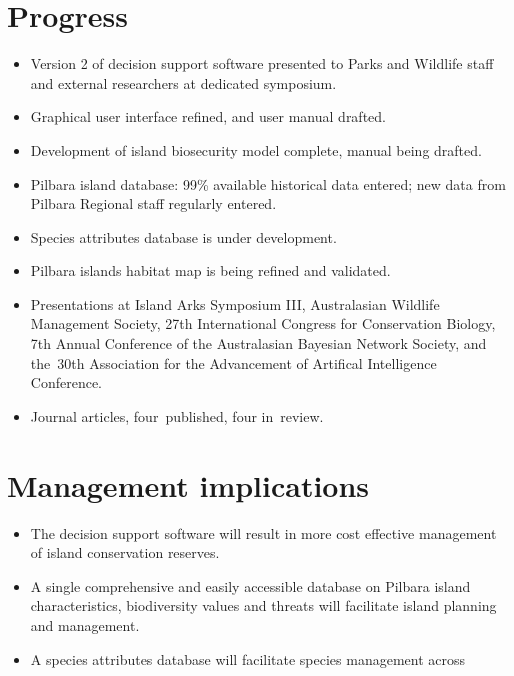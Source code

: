 \documentclass[version=last,
    paper=a4, %
    10pt, %
    usenames,
    dvipsnames,
    oneside, %
    headings=openany, %
    DIV=15 %
]{scrbook}
\begin{document}
\section*{Progress}

\begin{itemize}
\itemsep1pt\parskip0pt
\item
  Version 2 of decision support software presented to Parks and Wildlife
  staff and external researchers at dedicated symposium.~
\item
  Graphical user interface refined, and user manual drafted.
\item
  Development of island biosecurity model complete, manual being
  drafted.
\item
  Pilbara island database: 99\% available historical data entered; new
  data from Pilbara Regional staff regularly entered.
\item
  Species attributes database is under development.
\item
  Pilbara islands habitat map is being refined and validated.
\item
  Presentations at Island Arks Symposium III, Australasian Wildlife
  Management Society, 27th International Congress for Conservation
  Biology, 7th Annual Conference of the Australasian Bayesian Network
  Society, and the~30th Association for the Advancement of Artifical
  Intelligence Conference.
\item
  Journal articles, four~published, four in~review.
\end{itemize}




\section*{Management implications}

\begin{itemize}
\itemsep1pt\parskip0pt
\item
  The decision support software will result in more cost effective
  management of island conservation reserves.
\item
  A single comprehensive and easily accessible database on Pilbara
  island characteristics, biodiversity values and threats will
  facilitate island planning and management.
\item
  A species attributes database will facilitate species management
  across Western Australia and the identification of priorities with
  regard to quarantine, surveillance, and biological survey on Pilbara
  islands.
\end{itemize}
\end{document}
